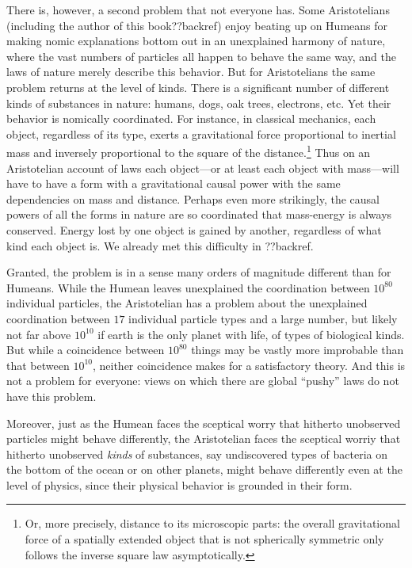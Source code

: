 There is, however, a second problem that not everyone has. Some Aristotelians (including the author of this book??backref) 
enjoy beating up on Humeans for making 
nomic explanations bottom out in an unexplained harmony of nature, where the vast numbers of particles all 
happen to behave the same way, and the laws of nature merely describe this behavior. But for Aristotelians the same problem returns 
at the level of kinds. There is a significant number of different kinds of 
substances in nature: humans, dogs, oak trees, electrons, etc. Yet their behavior is nomically coordinated. For instance,
in classical mechanics, each object, regardless of its type, exerts a gravitational force proportional to inertial mass
and inversely proportional to the square of the distance.\footnote{Or, more precisely, distance to its microscopic parts: the overall
gravitational force of a spatially extended object that is not spherically symmetric only follows the inverse square law 
asymptotically.}  Thus on an Aristotelian account of laws each object---or at 
least each object with mass---will have to have a form with a gravitational causal power with the same dependencies on 
mass and distance. Perhaps even more strikingly, the causal powers of all the forms in nature are so coordinated that 
mass-energy is always conserved. Energy lost by one object is gained by another, regardless of what kind each object 
is. We already met this difficulty in ??backref.

Granted, the problem is in a sense many orders of magnitude different than for Humeans. While the Humean leaves 
unexplained the coordination between $10^{80}$ individual particles, the Aristotelian has a problem about the 
unexplained coordination between $17$ individual particle types and a large number, but likely not far above $10^{10}$
if earth is the only planet with life, of types of biological kinds. But while a coincidence between $10^{80}$ things
may be vastly more improbable than that between $10^{10}$, neither coincidence makes for a satisfactory theory.
And this is not a problem for everyone: views on which there are global ``pushy'' laws do not have this problem. 

Moreover, just as the Humean faces the sceptical worry that hitherto unobserved particles might behave differently, 
the Aristotelian faces the sceptical worriy that hitherto unobserved \textit{kinds} of substances, say undiscovered 
types of bacteria on the bottom of the ocean or on other planets, might behave differently even at the level of physics, 
since their physical behavior is grounded in their form. 

